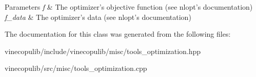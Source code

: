\begin{DoxyParams}{Parameters}
{\em f} & The optimizer's objective function (see nlopt's documentation) \\
\hline
{\em f\+\_\+data} & The optimizer's data (see nlopt's documentation) \\
\hline
\end{DoxyParams}


The documentation for this class was generated from the following files\+:\begin{DoxyCompactItemize}
\item 
vinecopulib/include/vinecopulib/misc/tools\+\_\+optimization.\+hpp\item 
vinecopulib/src/misc/tools\+\_\+optimization.\+cpp\end{DoxyCompactItemize}
